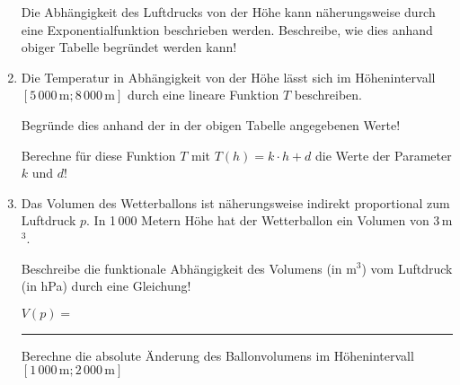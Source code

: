 \begin{langesbeispiel}
\begin{enumerate}
	Die Abhängigkeit des Luftdrucks von der Höhe kann näherungsweise durch eine Exponentialfunktion beschrieben werden. Beschreibe, wie dies anhand obiger Tabelle begründet werden kann!
	
	\item Die Temperatur in Abhängigkeit von der Höhe lässt sich im Höhenintervall $[5\,000\,\text{m}; 8\,000\,\text{m}]$ durch eine lineare Funktion $T$ beschreiben.\leer
	
	Begründe dies anhand der in der obigen Tabelle angegebenen Werte!\leer
	
	Berechne für diese Funktion $T$ mit $T(h)=k\cdot h+d$ die Werte der Parameter $k$ und $d$!
	
	\item Das Volumen des Wetterballons ist näherungsweise indirekt proportional zum Luftdruck $p$. In 1\,000 Metern Höhe hat der Wetterballon ein Volumen von 3\,m$^3$.
	
	Beschreibe die funktionale Abhängigkeit des Volumens (in m$^3$) vom Luftdruck (in hPa) durch eine Gleichung!
	
	$V(p)=$ \rule{5cm}{0.3pt}
	
	Berechne die absolute Änderung des Ballonvolumens im Höhenintervall $[1\,000\,\text{m}; 2\,000\,\text{m}]$
						\end{enumerate}\leer
				
\end{langesbeispiel}
